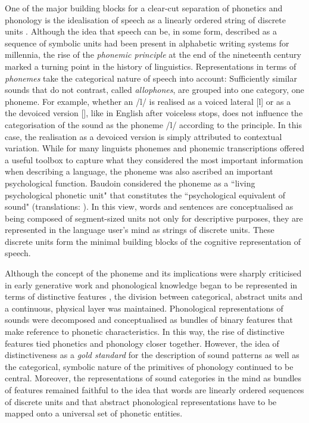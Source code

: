 One of the major building blocks for a clear-cut separation of phonetics and phonology is the idealisation of speech as a linearly ordered string of discrete units \citep{Ladd2014, DurandLaks2002}. Although the idea that speech can be, in some form, described as a sequence of symbolic units had been present in alphabetic writing systems for millennia, the rise of the \emph{phonemic principle} at the end of the nineteenth century marked a turning point in the history of linguistics. Representations in terms of \emph{phonemes} take the categorical nature of speech into account: Sufficiently similar sounds that do not contrast, called \emph{allophones}, are grouped into one category, one phoneme. For example, whether an /l/ is realised as a voiced lateral [l] or as a the devoiced version [], like in English after voiceless stops, does not influence the categorisation of the sound as the phoneme /l/ according to the principle. In this case, the realisation as a devoiced version is simply attributed to contextual variation. While for many linguists phonemes and phonemic transcriptions offered a useful toolbox to capture what they considered the most important information when describing a language, the phoneme was also ascribed an important psychological function. Baudoin \cite{Courtenay1963} considered the phoneme as a ``living psychological phonetic unit" that constitutes the ``psychological equivalent of sound" (translations: \citealp[18]{DurandLaks2002}). In this view, words and sentences are conceptualised as being composed of segment-sized units not only for descriptive purposes, they are represented in the language user's mind as strings of discrete units. These discrete units form the minimal building blocks of the cognitive representation of speech.

Although the concept of the phoneme and its implications were sharply criticised in early generative work \citep{Chomsky1964} and phonological knowledge began to be represented in terms of distinctive features \citep{JacobsonFantHalle1952,ChomskyHalle1968}, the division between categorical, abstract units and a continuous, physical layer was maintained. Phonological representations of sounds were decomposed and conceptualised as bundles of binary features that make reference to phonetic characteristics. In this way, the rise of distinctive features tied phonetics and phonology closer together. However, the idea of distinctiveness as a \emph{gold standard} for the description of sound patterns as well as the categorical, symbolic nature of the primitives of phonology continued to be central. Moreover, the representations of sound categories in the mind as bundles of features remained faithful to the idea that words are linearly ordered sequences of discrete units and that abstract phonological representations have to be mapped onto a universal set of phonetic entities.

